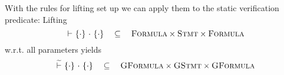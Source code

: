 With the rules for lifting set up we can apply them to the static verification predicate:
Lifting 
$${~} \,\,{\vdash}\,\, \{{\cdot}\} ~{\cdot}~ \{{\cdot}\} ~~~\subseteq~~~ \textsc{Formula} \times \textsc{Stmt} \times \textsc{Formula}$$
w.r.t. all parameters yields
$${~} \,\,\widetilde{\vdash}\,\, \{{\cdot}\} ~{\cdot}~ \{{\cdot}\} ~~~\subseteq~~~ \textsc{GFormula} \times \textsc{GStmt} \times \textsc{GFormula}$$






